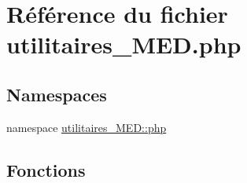 \hypertarget{utilitaires__MED_8php}{
\section{R\'{e}f\'{e}rence du fichier utilitaires\_\-MED.php}
\label{utilitaires__MED_8php}
}
\subsection*{Namespaces}
\begin{CompactItemize}
\item 
namespace \hyperlink{namespaceutilitaires__MED_1_1php}{utilitaires\_\-MED::php}
\end{CompactItemize}
\subsection*{Fonctions}
